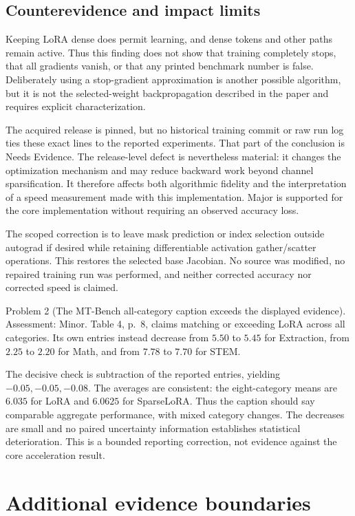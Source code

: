 \documentclass[10pt]{article}
\begin{document}
\subsection*{Counterevidence and impact limits}
Keeping LoRA dense does permit learning, and dense tokens and other paths remain active. Thus this finding does not show that training completely stops, that all gradients vanish, or that any printed benchmark number is false. Deliberately using a stop-gradient approximation is another possible algorithm, but it is not the selected-weight backpropagation described in the paper and requires explicit characterization.\par
The acquired release is pinned, but no historical training commit or raw run log ties these exact lines to the reported experiments. That part of the conclusion is Needs Evidence. The release-level defect is nevertheless material: it changes the optimization mechanism and may reduce backward work beyond channel sparsification. It therefore affects both algorithmic fidelity and the interpretation of a speed measurement made with this implementation. Major is supported for the core implementation without requiring an observed accuracy loss.\par
The scoped correction is to leave mask prediction or index selection outside autograd if desired while retaining differentiable activation gather/scatter operations. This restores the selected base Jacobian. No source was modified, no repaired training run was performed, and neither corrected accuracy nor corrected speed is claimed.\par
Problem 2 (The MT-Bench all-category caption exceeds the displayed evidence).  Assessment: Minor. Table 4, p. 8, claims matching or exceeding LoRA across all categories. Its own entries instead decrease from \(5.50\) to \(5.45\) for Extraction, from \(2.25\) to \(2.20\) for Math, and from \(7.78\) to \(7.70\) for STEM.\par
The decisive check is subtraction of the reported entries, yielding \(-0.05,-0.05,-0.08\). The averages are consistent: the eight-category means are \(6.035\) for LoRA and \(6.0625\) for SparseLoRA. Thus the caption should say comparable aggregate performance, with mixed category changes. The decreases are small and no paired uncertainty information establishes statistical deterioration. This is a bounded reporting correction, not evidence against the core acceleration result.\par
\section*{Additional evidence boundaries}
\end{document}
